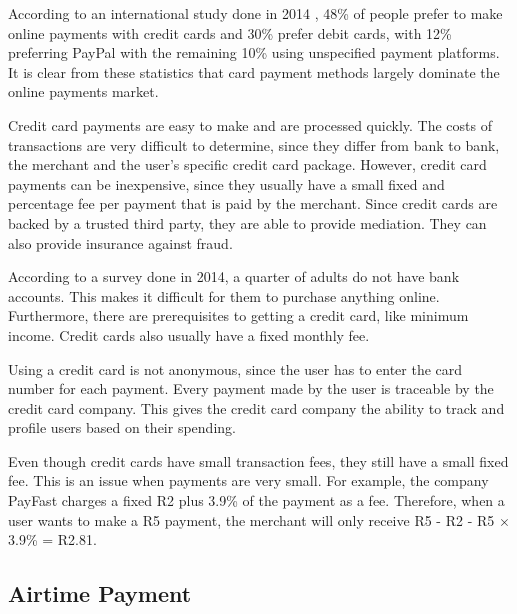 According to an international study done in 2014 \cite{tsys}, 48\% of people prefer to make online payments with credit cards and 30\% prefer debit cards, with 12\% preferring PayPal with the remaining 10\% using unspecified payment platforms. It is clear from these statistics that card payment methods largely dominate the online payments market. 


Credit card payments are easy to make and are processed quickly. The costs of transactions are very difficult to determine, since they differ from bank to bank, the merchant and the user's specific credit card package. However, credit card payments can be inexpensive, since they usually have a small fixed and percentage fee per payment that is paid by the merchant. Since credit cards are backed by a trusted third party, they are able to provide mediation. They can also provide insurance against fraud. 


According to a survey done in 2014, a quarter of adults do not have bank accounts\cite{finmark}. This makes it difficult for them to purchase anything online. Furthermore, there are prerequisites to getting a credit card, like minimum income. Credit cards also usually have a fixed monthly fee.

Using a credit card is not anonymous, since the user has to enter the card number for each payment. Every payment made by the user is traceable by the credit card company. This gives the credit card company the ability to track and profile users based on their spending\cite{visa}.

Even though credit cards have small transaction fees, they still have a small fixed fee. This is an issue when payments are very small. For example, the company PayFast \cite{PayFast} charges a fixed R2 plus 3.9\% of the payment as a fee. Therefore, when a user wants to make a R5 payment, the merchant will only receive R5 - R2 - R5 $\times$ 3.9\% = R2.81. 


\subsection{Airtime Payment}

